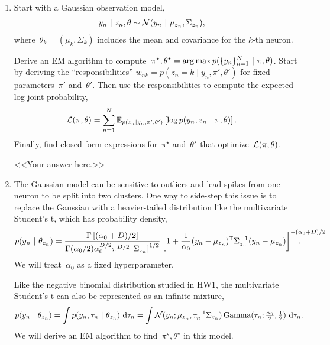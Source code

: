 \documentclass[11pt]{article}
\begin{document}
\begin{enumerate}[label=(\alph*)]

\item Start with a Gaussian observation model,
\begin{align*}
    y_n ~\vert~ z_n, \theta &\sim \mathcal{N}(y_n ~\vert~ \mu_{z_n}, \Sigma_{z_n}),
\end{align*}
where~$\theta_k = (\mu_k, \Sigma_k)$ includes the mean and covariance for the $k$-th neuron.  

Derive an EM algorithm to compute~$\pi^\star, \theta^\star = \operatorname*{arg\,max} p(\{y_n\}_{n=1}^N ~\vert~ \pi, \theta)$.  Start by deriving the ``responsibilities'' $w_{nk} = p(z_n = k \mid y_n, \pi', \theta')$ for fixed parameters~$\pi'$ and~$\theta'$.  Then use the responsibilities to compute the expected log joint probability,
\begin{align*}
    \mathcal{L}(\pi, \theta) &= \sum_{n=1}^N \mathbb{E}_{p(z_n | y_n, \pi', \theta')} \left[ \log p(y_n, z_n ~\vert~ \pi, \theta) \right].
\end{align*}
Finally, find closed-form expressions for~$\pi^\star$ and~$\theta^\star$ that optimize~$\mathcal{L}(\pi, \theta)$.

\begin{solution}
<<Your answer here.>>
\end{solution}

\item The Gaussian model can be sensitive to outliers and lead spikes from one neuron to be split into two clusters.  One way to side-step this issue is to replace the Gaussian with a heavier-tailed distribution like the multivariate Student's t, which has probability density,
\begin{align*}
    p(y_n \mid \theta_{z_n}) &=  {\frac {\Gamma \left[(\alpha_0 +D)/2\right]}{\Gamma (\alpha_0 /2)\alpha_0 ^{D/2}\pi ^{D/2}\left|{\Sigma_{z_n}}\right|^{1/2}}} \left[1+{\frac{1}{\alpha_0}} (y_n-\mu_{z_n})^\trans \Sigma_{z_n}^{-1}(y_n - \mu_{z_n})\right]^{-(\alpha_0 +D)/2} \hspace{-3.5em}.
\end{align*}
We will treat~$\alpha_0$ as a fixed hyperparameter. 

Like the negative binomial distribution studied in HW1, the multivariate Student's t can also be represented as an infinite mixture,
\begin{align*}
    p(y_n ~\vert~ \theta_{z_n}) &= \int p(y_n, \tau_n ~\vert~ \theta_{z_n}) \, \mathop{}\!\mathrm{d} \tau_n 
    = \int \mathcal{N}(y_n ; \mu_{z_n}, \tau_n^{-1} \Sigma_{z_n}) \, \mathrm{Gamma}(\tau_n ; \tfrac{\alpha_0}{2}, \tfrac{1}{2}) \, \mathop{}\!\mathrm{d} \tau_n.
\end{align*}
We will derive an EM algorithm to find~$\pi^\star, \theta^\star$ in this model. 


\end{enumerate}
\end{document}
